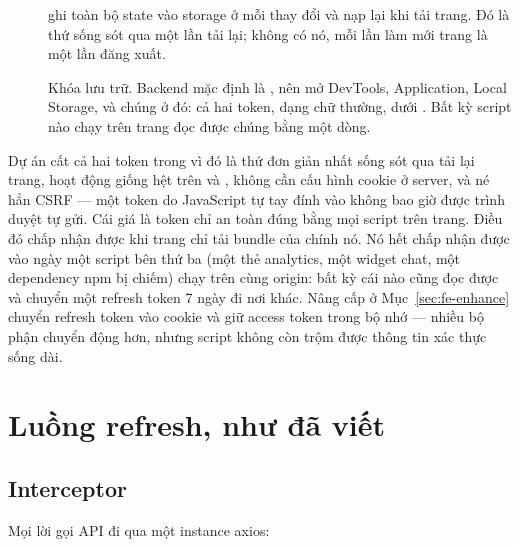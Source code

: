 \begin{description}
  \item[]  ghi toàn bộ state vào storage ở mỗi
  thay đổi và nạp lại khi tải trang. Đó là thứ sống sót qua một lần
  tải lại; không có nó, mỗi lần làm mới trang là một lần đăng xuất.
  \item[] Khóa lưu trữ. Backend mặc định là ,
  nên mở DevTools, Application, Local Storage, và chúng ở đó: cả hai
  token, dạng chữ thường, dưới . Bất kỳ script nào
  chạy trên trang đọc được chúng bằng một dòng.
\end{description}

\begin{decision}
Dự án cất cả hai token trong  vì đó là thứ đơn giản
nhất sống sót qua tải lại trang, hoạt động giống hệt trên
 và , không cần cấu hình cookie ở
server, và né hẳn CSRF --- một token do JavaScript tự tay đính vào
không bao giờ được trình duyệt tự gửi. Cái giá là token chỉ an toàn
đúng bằng mọi script trên trang. Điều đó chấp nhận được khi trang chỉ
tải bundle của chính nó. Nó hết chấp nhận được vào ngày một script bên
thứ ba (một thẻ analytics, một widget chat, một dependency npm bị
chiếm) chạy trên cùng origin: bất kỳ cái nào cũng đọc được
 và chuyển một refresh token 7 ngày đi nơi khác.
Nâng cấp ở Mục~\ref{sec:fe-enhance} chuyển refresh token vào cookie
 và giữ access token trong bộ nhớ --- nhiều bộ phận
chuyển động hơn, nhưng script không còn trộm được thông tin xác thực
sống dài.
\end{decision}

\section{Luồng refresh, như đã viết}

\subsection{Interceptor}

Mọi lời gọi API đi qua một instance axios:

